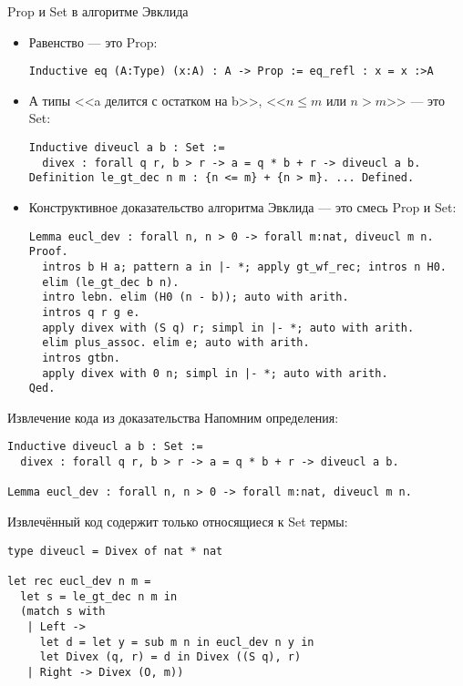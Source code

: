 \documentclass[aspectratio=169,dvipsnames,usenames]{beamer}
\begin{document}
\begin{frame}[fragile]{Prop и Set в алгоритме Эвклида}
\begin{itemize}
\item Равенство --- это Prop:
\small\color[HTML]{025002}\begin{verbatim}
Inductive eq (A:Type) (x:A) : A -> Prop := eq_refl : x = x :>A
\end{verbatim}
\normalsize\color{black}
\item А типы <<a делится с остатком на b>>, <<$n \le m$ или $n > m$>> --- это Set:

\small\color[HTML]{025002}\begin{verbatim}
Inductive diveucl a b : Set :=
  divex : forall q r, b > r -> a = q * b + r -> diveucl a b.
Definition le_gt_dec n m : {n <= m} + {n > m}. ... Defined.
\end{verbatim}

\normalsize\color{black}
\item Конструктивное доказательство алгоритма Эвклида --- это смесь Prop и Set:
\small\color[HTML]{025002}
\begin{verbatim}
Lemma eucl_dev : forall n, n > 0 -> forall m:nat, diveucl m n.
Proof.
  intros b H a; pattern a in |- *; apply gt_wf_rec; intros n H0.
  elim (le_gt_dec b n).
  intro lebn. elim (H0 (n - b)); auto with arith.
  intros q r g e.
  apply divex with (S q) r; simpl in |- *; auto with arith.
  elim plus_assoc. elim e; auto with arith.
  intros gtbn.
  apply divex with 0 n; simpl in |- *; auto with arith.
Qed.
\end{verbatim}
\end{itemize}
\end{frame}

\begin{frame}[fragile]{Извлечение кода из доказательства}
Напомним определения:
\small\color[HTML]{025002}\begin{verbatim}
Inductive diveucl a b : Set :=
  divex : forall q r, b > r -> a = q * b + r -> diveucl a b.

Lemma eucl_dev : forall n, n > 0 -> forall m:nat, diveucl m n.
\end{verbatim}
\normalsize\color{black}

Извлечённый код содержит только относящиеся к Set термы:

\small\color[HTML]{025002}
\begin{verbatim}
type diveucl = Divex of nat * nat

let rec eucl_dev n m =
  let s = le_gt_dec n m in
  (match s with
   | Left ->
     let d = let y = sub m n in eucl_dev n y in
     let Divex (q, r) = d in Divex ((S q), r)
   | Right -> Divex (O, m))
\end{verbatim}
\end{frame}
\end{document}
